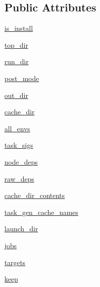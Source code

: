 \subsection*{Public Attributes}
\begin{DoxyCompactItemize}
\item 
\hyperlink{classwaflib_1_1_build_1_1_build_context_a15172299a2c83345ce649cd386fc513f}{is\+\_\+install}
\item 
\hyperlink{classwaflib_1_1_build_1_1_build_context_a354ed67655d084a2679fbb20edd8dae4}{top\+\_\+dir}
\item 
\hyperlink{classwaflib_1_1_build_1_1_build_context_a37fa970c1e2e228649af000bd6d2eaac}{run\+\_\+dir}
\item 
\hyperlink{classwaflib_1_1_build_1_1_build_context_a5a860fa88984277b39b90e1f0db568ab}{post\+\_\+mode}
\item 
\hyperlink{classwaflib_1_1_build_1_1_build_context_a575fc2582a355eedbb51384446c5bf56}{out\+\_\+dir}
\item 
\hyperlink{classwaflib_1_1_build_1_1_build_context_a47f872d830a4c4d4233623c444d5bc44}{cache\+\_\+dir}
\item 
\hyperlink{classwaflib_1_1_build_1_1_build_context_a6ea927d72ed5e1e06f309f73167293c4}{all\+\_\+envs}
\item 
\hyperlink{classwaflib_1_1_build_1_1_build_context_a3cf2fca35f448164b008964c0e8af14d}{task\+\_\+sigs}
\item 
\hyperlink{classwaflib_1_1_build_1_1_build_context_a435acc7f26c2feb1916ba121dd84a894}{node\+\_\+deps}
\item 
\hyperlink{classwaflib_1_1_build_1_1_build_context_a1aa6c8d3de4821202677432adbfe87d7}{raw\+\_\+deps}
\item 
\hyperlink{classwaflib_1_1_build_1_1_build_context_a9018ff10d597792e16549f40d3fef3e7}{cache\+\_\+dir\+\_\+contents}
\item 
\hyperlink{classwaflib_1_1_build_1_1_build_context_af36722ba96a65662c05c1a21736174c4}{task\+\_\+gen\+\_\+cache\+\_\+names}
\item 
\hyperlink{classwaflib_1_1_build_1_1_build_context_ae4ae0db442d595864759bbcb75b4e73f}{launch\+\_\+dir}
\item 
\hyperlink{classwaflib_1_1_build_1_1_build_context_a0d57e0cfb7921d3e97841c44c32801d6}{jobs}
\item 
\hyperlink{classwaflib_1_1_build_1_1_build_context_ab0d081dc124112a6bc7ef06387ac498b}{targets}
\item 
\hyperlink{classwaflib_1_1_build_1_1_build_context_a735ba611e1b0ce0b43b278c3ccf3e838}{keep}

\end{DoxyCompactItemize}

